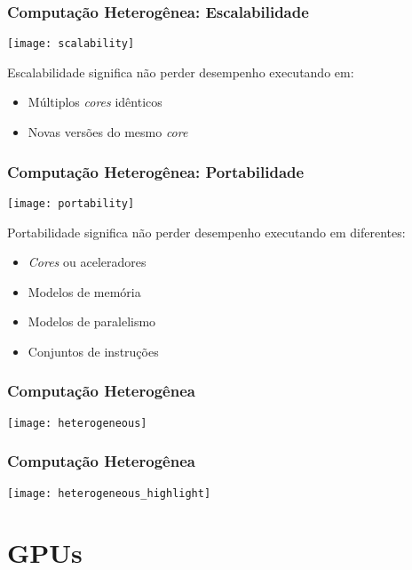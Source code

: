 \documentclass[10pt, compress, aspectratio=43, xcolor={table,usenames,dvipsnames}]{beamer}
\begin{document}
\begin{frame}
    \frametitle{Computação Heterogênea: Escalabilidade}
    \begin{center}
        \texttt{[image: scalability]}
    \end{center}

    \alert{Escalabilidade} significa não perder desempenho
        executando em:
    \begin{itemize}
        \item Múltiplos \textit{cores} idênticos
        \item Novas versões do mesmo \textit{core}
    \end{itemize}
\end{frame}

\begin{frame}
    \frametitle{Computação Heterogênea: Portabilidade}
    \begin{center}
        \texttt{[image: portability]}
    \end{center}

    \alert{Portabilidade} significa não perder desempenho
        executando em diferentes:
    \begin{itemize}
        \item \textit{Cores} ou \alert{aceleradores}
        \item Modelos de memória
        \item Modelos de paralelismo
        \item Conjuntos de instruções
    \end{itemize}
\end{frame}

\begin{frame}
    \frametitle{Computação Heterogênea}
    \centering
    \texttt{[image: heterogeneous]}
\end{frame}

\begin{frame}
    \frametitle{Computação Heterogênea}
    \centering
    \texttt{[image: heterogeneous\_highlight]}
\end{frame}

\section{GPUs}
\end{document}
